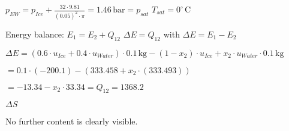 \( p_{EW} = p_{Ice} + \frac{32 \cdot 9.81}{(0.05)^2 \cdot \pi} = 1.46 \, \text{bar} = p_{sat} \)  
\( T_{sat} = 0^\circ \, \text{C} \)  

Energy balance:  
\( E_1 = E_2 + Q_{12} \)  
\( \Delta E = Q_{12} \) with \( \Delta E = E_1 - E_2 \)  

\( \Delta E = (0.6 \cdot u_{Ice} + 0.4 \cdot u_{Water}) \cdot 0.1 \, \text{kg} - (1 - x_2) \cdot u_{Ice} + x_2 \cdot u_{Water} \cdot 0.1 \, \text{kg} \)  

\( = 0.1 \cdot (-200.1) - (333.458 + x_2 \cdot (333.493)) \)  

\( = -13.34 - x_2 \cdot 33.34 = Q_{12} = 1368.2 \)  

\( \Delta S \)  

No further content is clearly visible.